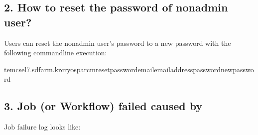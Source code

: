 \documentclass[a4paper,10pt,english]{sphinxmanual}
\begin{document}
\subsection{2. How to reset the password of non\sphinxhyphen{}admin user?}
\label{\detokenize{cryoSPARC:how-to-reset-the-password-of-non-admin-user}}
\sphinxAtStartPar
Users can reset the non\sphinxhyphen{}admin user’s password to a new password with the following command\sphinxhyphen{}line execution:

\begin{sphinxVerbatim}[commandchars=\\\{\}]
tem\PYGZhy{}cs\PYGZhy{}el7.sdfarm.kr\PYGZdl{}\PYGZgt{}cryosparcmresetpassword\PYGZhy{}\PYGZhy{}email\PYGZlt{}emailaddress\PYGZgt{}\PYGZhy{}\PYGZhy{}password\PYGZlt{}newpassword\PYGZgt{}
\end{sphinxVerbatim}


\subsection{3. Job (or Workflow) failed caused by }
\label{\detokenize{cryoSPARC:job-or-workflow-failed-caused-by-ssd-caching}}
\sphinxAtStartPar
Job failure log looks like:
\end{document}
